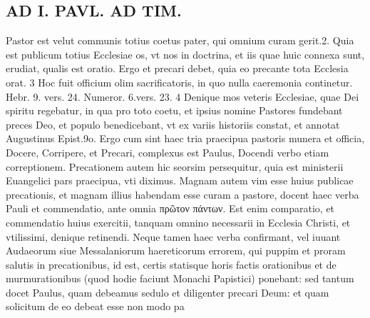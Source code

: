 \documentclass{article}
\begin{document}
\begin{pages}
\section*{AD I. PAVL. AD TIM. }
\marginpar{[ p.40 ]}\pstart Pastor est velut communis totius coetus pater, qui omnium curam gerit.2. Quia est publicum totius Ecclesiae os, vt nos in doctrina, et iis quae huic connexa sunt, erudiat, qualis est oratio. Ergo et precari debet, quia eo precante tota Ecclesia orat. 3 Hoc fuit officium olim sacrificatoris, in quo nulla caeremonia continetur. Hebr. 9. vers. 24. Numeror. 6.vers. 23. 4 Denique mos veteris Ecclesiae, quae Dei spiritu regebatur, in qua pro toto coetu, et ipsius nomine Pastores fundebant preces Deo, et populo benedicebant, vt ex variis historiis constat, et annotat Augustinus Epist.9o. Ergo cum sint haec tria praecipua pastoris munera et officia, Docere, Corripere, et Precari, complexus est Paulus, Docendi verbo etiam correptionem. Precationem autem hic seorsim persequitur, quia est ministerii Euangelici pars praecipua, vti diximus. Magnam autem vim esse huius publicae precationis, et magnam illius habendam esse curam a pastore, docent haec verba Pauli et commendatio, ante omnia πρῶτον πάντων. Est enim comparatio, et commendatio huius exercitii, tanquam omnino necessarii in Ecclesia Christi, et vtilissimi, denique retinendi. Neque tamen haec verba confirmant, vel iuuant Audaeorum siue Messalaniorum haereticorum errorem, qui puppim et proram salutis in precationibus, id est, certis statisque horis factis orationibus et de murmurationibus (quod hodie faciunt Monachi Papistici) ponebant: sed tantum docet Paulus, quam debeamus sedulo et diligenter precari Deum: et quam solicitum de eo debeat esse non modo pa\pend

\end{pages}
\end{document}
